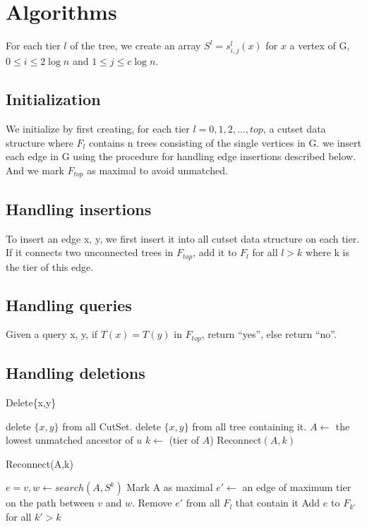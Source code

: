 \documentclass[conference,compsoc]{IEEEtran}
\begin{document}
\section{Algorithms}
For each tier $l$ of the tree, we create an array $S^l = s_{i,j}^l(x)$ for $x$ a vertex of G, $0 \leq i \leq 2 \log n$ and $1 \leq j \leq c \log n$.
\subsection{Initialization}
We initialize by first creating, for each tier $l = 0, 1,2, \dots , top$, a cutset data structure where $F_l$ contains n trees consisting of the single vertices in G. we insert each edge in G using the procedure for handling edge insertions described below. And we mark $F_{top}$ as maximal to avoid unmatched.
\subsection{Handling insertions}
To insert an edge {x, y}, we first insert it into all cutset data structure on each tier. If it connects two unconnected trees in $F_{top}$, add it to $F_l$ for all $l > k$ where k is the tier of this edge.
\subsection{Handling queries}
Given a query {x, y}, if $T(x) = T(y)$ in $F_{top}$, return “yes”, else return “no”.
\subsection{Handling deletions}
\begin{algorithm}[H]
\caption{Delete\{x,y\}}
\begin{algorithmic}[1]
\State delete $\{x,y\}$ from all CutSet.
\State delete $\{x,y\}$ from all tree containing it.
			\State $A \gets$ the lowest unmatched ancestor of $u$
			\State $k \gets$ (tier of $A$)
			\State Reconnect$(A,k)$
		\EndWhile
	\EndFor
\end{algorithmic}
\end{algorithm}
\begin{algorithm}
\caption{Reconnect(A,k)}
\begin{algorithmic}[1]
\State $e = {v,w} \gets search(A,S^k)$
		\State Mark A as maximal
	\Else
			\State $e' \gets$ an edge of maximum tier on the path between $v$ and $w$.
			\State Remove $e'$ from all $F_l$ that contain it
		\EndIf
		\State Add $e$ to $F_{k'}$ for all $k' > k$
	\EndIf
\end{algorithmic}

\end{algorithm}
\end{document}

